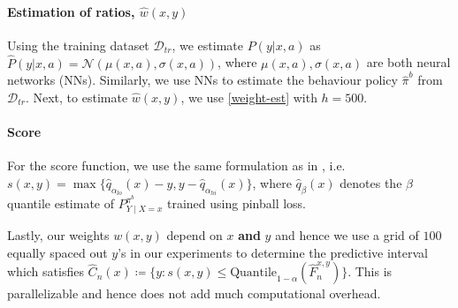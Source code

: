
\paragraph{Estimation of ratios, $\hat{w}(x, y)$\,}
Using the training dataset $\mathcal{D}_{tr}$, we estimate $P(y | x, a)$ as $\hat{P}(y | x, a) = \mathcal{N}(\mu(x, a), \sigma(x, a))$, where $\mu(x, a), \sigma(x, a)$ are both neural networks (NNs). Similarly, we use NNs to estimate the behaviour policy $\hat{\pi}^b$ from $\mathcal{D}_{tr}$. Next, to estimate $\hat{w}(x, y)$, we use \eqref{weight-est} with $h = 500$.

\paragraph{Score}
For the score function, we use the same formulation as in \cite{romano2019conformalized}, i.e. $s(x, y) = \max\{ \hat{q}_{\alpha_{lo}}(x) - y, y - \hat{q}_{\alpha_{hi}}(x) \}$, where $\hat{q}_\beta(x)$ denotes the $\beta$ quantile estimate of $P^{\pi^b}_{Y\mid X=x}$ trained using pinball loss.

Lastly, our weights $w(x, y)$ depend on $x$ \textbf{and} $y$ and hence we use a grid of $100$ equally spaced out $y$'s in our experiments to determine the predictive interval which satisfies $\hat{C}_n(x) \coloneqq \{y: s(x,y) \leq \text{Quantile}_{1-\alpha}(\hat{F}_{n}^{x, y})\}$. This is parallelizable and hence does not add much computational overhead.


